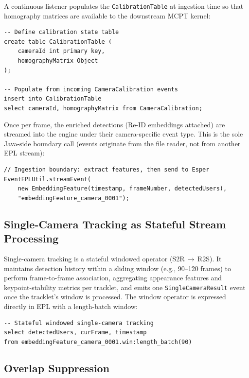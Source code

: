 \documentclass[review]{elsarticle}
\begin{document}
A continuous listener populates the \texttt{CalibrationTable} at ingestion time so that homography matrices are available to the downstream MCPT kernel:
\begin{verbatim}
-- Define calibration state table
create table CalibrationTable (
    cameraId int primary key,
    homographyMatrix Object
);

-- Populate from incoming CameraCalibration events
insert into CalibrationTable
select cameraId, homographyMatrix from CameraCalibration;
\end{verbatim}
Once per frame, the enriched detections (Re-ID embeddings attached) are streamed into the engine under their camera-specific event type. This is the sole Java-side boundary call (events originate from the file reader, not from another EPL stream):
\begin{verbatim}
// Ingestion boundary: extract features, then send to Esper
EventEPLUtil.streamEvent(
    new EmbeddingFeature(timestamp, frameNumber, detectedUsers),
    "embeddingFeature_camera_0001");
\end{verbatim}

\subsection{Single-Camera Tracking as Stateful Stream Processing}
\label{sec:single:sct}
Single-camera tracking is a stateful windowed operator (S2R\,$\rightarrow$\,R2S). It maintains detection history within a sliding window (e.g., 90--120 frames) to perform frame-to-frame association, aggregating appearance features and keypoint-stability metrics per tracklet, and emits one \texttt{SingleCameraResult} event once the tracklet's window is processed. The window operator is expressed directly in EPL with a length-batch window:
\begin{verbatim}
-- Stateful windowed single-camera tracking
select detectedUsers, curFrame, timestamp
from embeddingFeature_camera_0001.win:length_batch(90)
\end{verbatim}

\subsection{Overlap Suppression}
\label{sec:single:overlap}
\end{document}
